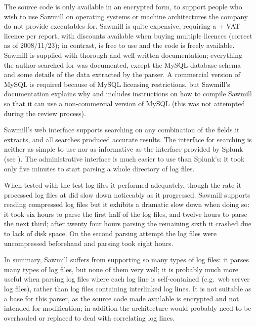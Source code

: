 The source code is only available in an encrypted form, to support people
who wish to use Sawmill on operating systems or machine architectures the
company do not provide executables for.  Sawmill is quite expensive,
requiring a  + VAT licence per report, with discounts available
when buying multiple licences (correct as of 2008/11/23); in contrast,
\parsername{} is free to use and the code is freely available.  Sawmill is
supplied with thorough and well written documentation; everything the
author searched for was documented, except the MySQL database schema and
some details of the data extracted by the parser.  A commercial version of
MySQL is required because of MySQL licensing restrictions, but Sawmill's
documentation explains why and includes instructions on how to compile
Sawmill so that it can use a non-commercial version of MySQL (this was not
attempted during the review process).

Sawmill's web interface supports searching on any combination of the fields
it extracts, and all searches produced accurate results.  The interface for
searching is neither as simple to use nor as informative as the interface
provided by Splunk (see ).  The administrative
interface is much easier to use than Splunk's: it took only five minutes to
start parsing a whole directory of log files.

When tested with the \numberOFlogFILES{} test log files it performed
adequately, though the rate it processed log files at did slow down
noticeably as it progressed.  Sawmill supports reading compressed log files
but it exhibits a dramatic slow down when doing so: it took six hours to
parse the first half of the log files, and twelve hours to parse the next
third; after twenty four hours parsing the remaining sixth it crashed due
to lack of disk space.  On the second parsing attempt the log files were
uncompressed beforehand and parsing took eight hours.

In summary, Sawmill suffers from supporting so many types of log files: it
parses many types of log files, but none of them very well; it is probably
much more useful when parsing log files where each log line is
self-contained (e.g.\ web server log files), rather than log files
containing interlinked log lines.  It is not suitable as a base for this
parser, as the source code made available is encrypted and not intended
for modification; in addition the architecture would probably need to be
overhauled or replaced to deal with correlating log lines.

